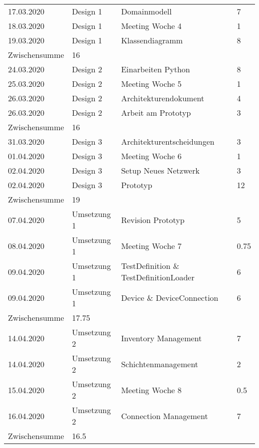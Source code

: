 \documentclass[
	ngerman,
	toc=listof, %
	toc=bibliography, %
	footnotes=multiple, %
	parskip=half, %
	numbers=noendperiod %
]{scrartcl}
\begin{document}
	\begin{tabularx}{\textwidth}{llXl}
		\toprule
		17.03.2020 & Design 1 & Domainmodell & 7 \\
		18.03.2020 & Design 1 & Meeting Woche 4 & 1 \\
		19.03.2020 & Design 1 & Klassendiagramm & 8 \\
		\midrule
		Zwischensumme & 16 & & \\
		\midrule
		24.03.2020 & Design 2 & Einarbeiten Python & 8 \\
		25.03.2020 & Design 2 & Meeting Woche 5 & 1 \\
		26.03.2020 & Design 2 & Architekturendokument & 4 \\
		26.03.2020 & Design 2 & Arbeit am Prototyp & 3 \\
		\midrule
		Zwischensumme & 16 & & \\
		\midrule
		31.03.2020 & Design 3 & Architekturentscheidungen & 3 \\
		01.04.2020 & Design 3 & Meeting Woche 6 & 1 \\
		02.04.2020 & Design 3 & Setup Neues Netzwerk & 3 \\
		02.04.2020 & Design 3 & Prototyp & 12 \\
		\midrule
		Zwischensumme & 19 & & \\
		\midrule
		07.04.2020 & Umsetzung 1 & Revision Prototyp & 5 \\
		08.04.2020 & Umsetzung 1 & Meeting Woche 7 & 0.75 \\
		09.04.2020 & Umsetzung 1 & TestDefinition \& TestDefinitionLoader & 6 \\
		09.04.2020 & Umsetzung 1 & Device \& DeviceConnection & 6 \\
		\midrule
		Zwischensumme & 17.75 & & \\
		\midrule
		14.04.2020 & Umsetzung 2 & Inventory Management & 7 \\
		14.04.2020 & Umsetzung 2 & Schichtenmanagement & 2 \\
		15.04.2020 & Umsetzung 2 & Meeting Woche 8 & 0.5 \\
		16.04.2020 & Umsetzung 2 & Connection Management & 7 \\
		\midrule
		Zwischensumme & 16.5 & & \\
		\bottomrule
	\end{tabularx}
\end{document}
